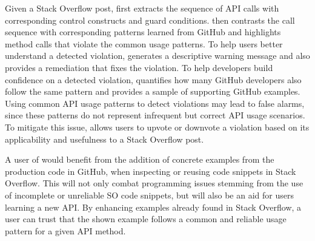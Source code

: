 Given a Stack Overflow post, {\tool} first extracts the sequence of API calls with corresponding control constructs and guard conditions. {\tool} then contrasts the call sequence with corresponding patterns learned from GitHub and highlights method calls that violate the common usage patterns. To help users better understand a detected violation, {\tool} generates a descriptive warning message and also provides a remediation that fixes the violation. To help developers build confidence on a detected violation, {\tool} quantifies how many GitHub developers also follow the same pattern and provides a sample of supporting GitHub examples. Using common API usage patterns to detect violations may lead to false alarms, since these patterns do not represent infrequent but correct API usage scenarios. To mitigate this issue, {\tool} allows users to upvote or downvote a  violation based on its applicability and usefulness to a Stack Overflow post.

A user of {\tool} would benefit from the addition of concrete examples from the production code in GitHub, when inspecting or reusing code snippets in Stack Overflow. This will not only combat programming issues stemming from the use of incomplete or unreliable SO code snippets, but will also be an aid for users learning a new API. By enhancing examples already found in Stack Overflow, a user can trust that the shown example follows a common and reliable usage pattern for a given API method.

%
